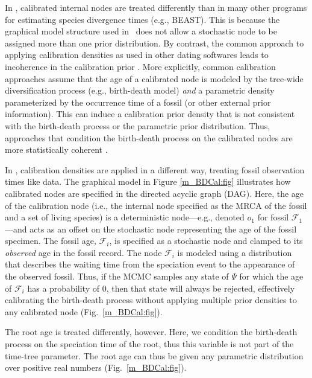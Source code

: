 In \RevBayes, calibrated internal nodes are treated differently than in many other programs for estimating species divergence times (e.g., BEAST).
This is because the graphical model structure used in \RevBayes~does not allow a stochastic node to be assigned more than one prior distribution. 
By contrast, the common approach to applying calibration densities as used in other dating softwares leads to incoherence in the calibration prior \citep[for detailed explainations of this see][]{warnock12,heled12,heath2013fossilized}. 
More explicitly, common calibration approaches assume that the age of a calibrated node is modeled by the tree-wide diversification process (e.g., birth-death model) \textit{and} a parametric density parameterized by the occurrence time of a fossil (or other external prior information).
This can induce a calibration prior density that is not consistent with the birth-death process or the parametric prior distribution. 
Thus, approaches that condition the birth-death process on the calibrated nodes are more statistically coherent \citep{yang06}.

In \RevBayes, calibration densities are applied in a different way, treating fossil observation times like data. 
The graphical model in Figure \ref{m_BDCal:fig} illustrates how calibrated nodes are specified in the directed acyclic graph (DAG).
Here, the age of the calibration node (i.e., the internal node specified as the MRCA of the fossil and a set of living species) is a deterministic node---e.g., denoted $o_1$ for fossil $\mathcal{F}_1$---and acts as an offset on the stochastic node representing the age of the fossil specimen.
The fossil age, $\mathcal{F}_i$, is specified as a stochastic node and clamped to its \textit{observed} age in the fossil record. 
The node $\mathcal{F}_i$ is modeled using a distribution that describes the waiting time from the speciation event to the appearance of the observed fossil. 
Thus, if the MCMC samples any state of $\Psi$ for which the age of $\mathcal{F}_i$ has a probability of 0, then that state will always be rejected, effectively calibrating the birth-death process without applying multiple prior densities to any calibrated node (Fig.~\ref{m_BDCal:fig}).

The root age is treated differently, however. 
Here, we condition the birth-death process on the speciation time of the root, thus this variable is not part of the time-tree parameter. 
The root age can thus be given any parametric distribution over positive real numbers (Fig.~\ref{m_BDCal:fig}).


